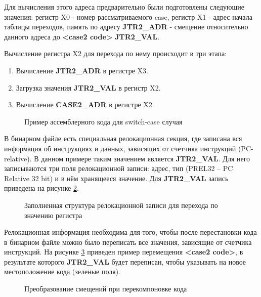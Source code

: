 Для вычисления этого адреса предварительно были подготовлены следующие значения: регистр X0 - номер рассматриваемого case, регистр X1 - адрес начала таблицы переходов, память по адресу \textbf{JTR2\_ADR} - смещение относительно данного адреса до \textbf{<case2 code>} \textbf{JTR2\_VAL}.

Вычисление регистра X2 для перехода по нему происходит в три этапа:
\begin{enumerate}[beginpenalty=10000]
  \item Вычисление \textbf{JTR2\_ADR} в регистре X3.
  \item Загрузка значения \textbf{JTR2\_VAL} в регистр X2.
  \item Вычисление \textbf{CASE2\_ADR} в регистре X2.
\end{enumerate}


\begin{figure}[!h]
    \centerfloat{
        \texttt{[image: jt2]}
    }
    \caption{Пример ассемблерного кода для switch-case случая}\label{fig:SC1}
\end{figure}

В бинарном файле есть специальная релокационная секция, где записана вся информация об инструкциях и данных, зависящих от счетчика инструкций (PC-relative). В данном примере таким значением является  \textbf{JTR2\_VAL}. Для него записываются три поля релокационной записи: адрес, тип (PREL32 -- PC Relative 32 bit) и в нём хранящееся значение. Для \textbf{JTR2\_VAL} запись приведена на рисунке \cref{fig:Rel1}.

\begin{figure}[!h]
    \centerfloat{
        \texttt{[image: jt\_1]}
    }
    \caption{Заполненная структура релокационной записи для перехода по значению регистра}\label{fig:Rel1}
\end{figure}

Релокационная информация необходима для того, чтобы после перестановки кода в бинарном файле можно было переписать все значения, зависящие от счетчика инструкций. На рисунке \cref{fig:SC2} приведен пример перемещения \textbf{<case2 code>}, в результате которого \textbf{JTR2\_VAL} будет переписан, чтобы указывать на новое местоположение кода (зеленые поля).

\begin{figure}[!h]
    \centerfloat{
        \texttt{[image: jt3]}
    }
    \caption{Преобразование смещений при перекомпоновке кода}\label{fig:SC2}
\end{figure}

